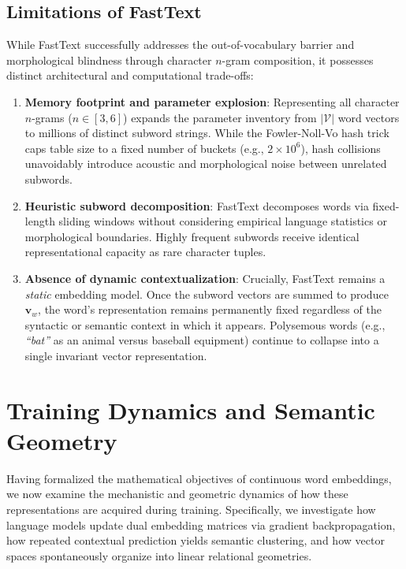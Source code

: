 \documentclass[../../main.tex]{subfiles}
\begin{document}
\clearpage

\subsection{Limitations of FastText}
\label{subsec:fasttext_limitations}

While FastText successfully addresses the out-of-vocabulary barrier and morphological blindness through character $n$-gram composition, it possesses distinct architectural and computational trade-offs:
\begin{enumerate}
    \item \textbf{Memory footprint and parameter explosion}: Representing all character $n$-grams ($n \in [3, 6]$) expands the parameter inventory from $|\mathcal{V}|$ word vectors to millions of distinct subword strings. While the Fowler-Noll-Vo hash trick caps table size to a fixed number of buckets (e.g., $2 \times 10^6$), hash collisions unavoidably introduce acoustic and morphological noise between unrelated subwords.
    \item \textbf{Heuristic subword decomposition}: FastText decomposes words via fixed-length sliding windows without considering empirical language statistics or morphological boundaries. Highly frequent subwords receive identical representational capacity as rare character tuples.
    \item \textbf{Absence of dynamic contextualization}: Crucially, FastText remains a \textit{static} embedding model. Once the subword vectors are summed to produce $\mathbf{v}_w$, the word's representation remains permanently fixed regardless of the syntactic or semantic context in which it appears. Polysemous words (e.g., \textit{``bat''} as an animal versus baseball equipment) continue to collapse into a single invariant vector representation.
\end{enumerate}

\clearpage
\section{Training Dynamics and Semantic Geometry}
\label{sec:training_dynamics_semantics}

Having formalized the mathematical objectives of continuous word embeddings, we now examine the mechanistic and geometric dynamics of how these representations are acquired during training. Specifically, we investigate how language models update dual embedding matrices via gradient backpropagation, how repeated contextual prediction yields semantic clustering, and how vector spaces spontaneously organize into linear relational geometries.
\end{document}
